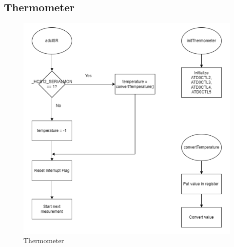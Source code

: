 \documentclass[a4paper,12pt]{article}
\begin{document}
\begin{center}
    \label{fig:MainFlowcharts}
\end{center}

\newpage

\subsection{Thermometer}
\begin{figure}[H]
    \centering
    \includegraphics[width=1\textwidth]{diagrams/thermometer.png}
    \caption{Thermometer}
    \label{fig:MainThermometer}
\end{figure}

\newpage
\end{document}
